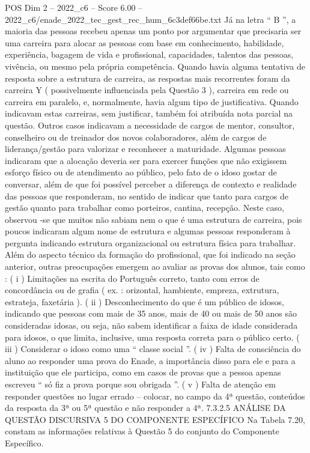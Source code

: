 \begin{textsample}{POS Dim 2 – 2022\_c6 – Score 6.00 – 2022\_c6/enade\_2022\_tec\_gest\_rec\_hum\_6c3def66be.txt}
Já na letra “ B ”, a maioria das pessoas recebeu apenas um ponto por argumentar que precisaria ser uma carreira para alocar as pessoas com base em conhecimento, habilidade, experiência, bagagem de vida e profissional, capacidades, talentos das pessoas, vivência, ou mesmo pela própria competência.
Quando havia alguma tentativa de resposta sobre a estrutura de carreira, as respostas mais recorrentes foram da carreira Y ( possivelmente influenciada pela Questão 3 ), carreira em rede ou carreira em paralelo, e, normalmente, havia algum tipo de justificativa.
Quando indicavam estas carreiras, sem justificar, também foi atribuída nota parcial na questão.
Outros casos indicavam a necessidade de cargos de mentor, consultor, conselheiro ou de treinador dos novos colaboradores, além de cargos de liderança/gestão para valorizar e reconhecer a maturidade.
Algumas pessoas indicaram que a alocação deveria ser para exercer funções que não exigissem esforço físico ou de atendimento ao público, pelo fato de o idoso gostar de conversar, além de que foi possível perceber a diferença de contexto e realidade das pessoas que responderam, no sentido de indicar que tanto para cargos de gestão quanto para trabalhar como porteiros, cantina, recepção.
Neste caso, observou -se que muitos não sabiam nem o que é uma estrutura de carreira, pois poucos indicaram algum nome de estrutura e algumas pessoas responderam à pergunta indicando estrutura organizacional ou estrutura física para trabalhar.
Além do aspecto técnico da formação do profissional, que foi indicado na seção anterior, outras preocupações emergem ao avaliar as provas dos alunos, tais como : ( i ) Limitações na escrita do Português correto, tanto com erros de concordância ou de grafia ( ex. : orizontal, hambiente, empreza, extrutura, estrateja, faxetária ). ( ii ) Desconhecimento do que é um público de idosos, indicando que pessoas com mais de 35 anos, mais de 40 ou mais de 50 anos são consideradas idosas, ou seja, não sabem identificar a faixa de idade considerada para idosos, o que limita, inclusive, uma resposta correta para o público certo. ( iii ) Considerar o idoso como uma “ classe social ”. ( iv ) Falta de consciência do aluno ao responder uma prova do Enade, a importância disso para ele e para a instituição que ele participa, como em casos de provas que a pessoa apenas escreveu “ só fiz a prova porque sou obrigada ”. ( v ) Falta de atenção em responder questões no lugar errado – colocar, no campo da 4ª questão, conteúdos da resposta da 3ª ou 5ª questão e não responder a 4ª. 7.3.2.5 ANÁLISE DA QUESTÃO DISCURSIVA 5 DO COMPONENTE ESPECÍFICO Na Tabela 7.20, constam as informações relativas à Questão 5 do conjunto do Componente Específico.

\end{textsample}
